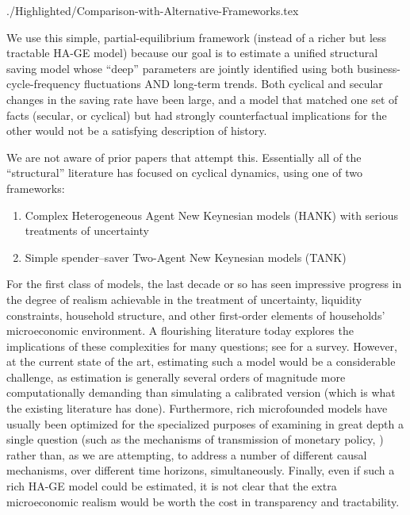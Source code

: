 \documentclass[titlepage]{\econtex}
\begin{document}
\begin{verbatimwrite}{./Highlighted/Comparison-with-Alternative-Frameworks.tex}

We use this simple, partial-equilibrium framework (instead of a richer but less tractable HA-GE model) because our goal is to estimate a unified structural saving model whose ``deep'' parameters are jointly identified using both business-cycle-frequency fluctuations AND long-term trends.  Both cyclical and secular changes in the saving rate have been large, and a model that matched one set of facts (secular, or cyclical) but had strongly counterfactual implications for the other would not be a satisfying description of history.

We are not aware of prior papers that attempt this.  Essentially all of the ``structural'' literature has focused on cyclical dynamics, using one of two frameworks:
\begin{enumerate}
\item Complex Heterogeneous Agent New Keynesian models (HANK) with serious treatments of uncertainty
\item Simple spender--saver Two-Agent New Keynesian models (TANK)
\end{enumerate}

\hypertarget{HA-Model-Too-Hard-Right-Now}{}
\hypertarget{HA-Models-Not-Used-Yet-For-Forecasting}{}
For the first class of models, the last decade or so has seen impressive progress in the degree of realism achievable in the treatment of uncertainty, liquidity constraints, household structure, and other first-order elements of households' microeconomic environment. A flourishing literature today explores the implications of these complexities for many questions; see \cite{kmpHandbook} for a survey. However, at the current state of the art, estimating such a model would be a considerable challenge, as estimation is generally several orders of magnitude more computationally demanding than simulating a calibrated version (which is what the existing literature has done).  Furthermore, rich microfounded models have usually been optimized for the specialized purposes of examining in great depth a single question (such as the mechanisms of transmission of monetary policy, \cite{kmvHANK}) rather than, as we are attempting, to address a number of different causal mechanisms, over different time horizons, simultaneously.  Finally, even if such a rich HA-GE model could be estimated, it is not clear that the extra microeconomic realism would be worth the cost in transparency and tractability.


\end{verbatimwrite}
\end{document}
